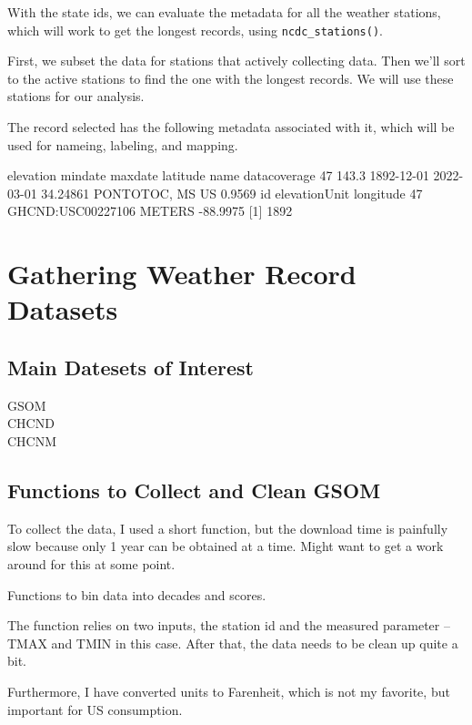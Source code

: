 \documentclass{article}
\begin{document}
With the state ids, we can evaluate the metadata for all the weather stations, which will work to get the longest records, using \texttt{ncdc\_stations()}. 

First, we subset the data for stations that actively collecting data. Then we'll sort to the active stations to find the one with the longest records. We will use these stations for our analysis.



The record selected has the following metadata associated with it, which will be used for nameing, labeling, and mapping. 

   elevation    mindate    maxdate latitude            name datacoverage
47     143.3 1892-12-01 2022-03-01 34.24861 PONTOTOC, MS US       0.9569
                  id elevationUnit longitude
47 GHCND:USC00227106        METERS  -88.9975
[1] 1892


\section{Gathering Weather Record Datasets}

\subsection{Main Datesets of Interest}

\begin{description}
  \item[GSOM]
  \item[CHCND]
  \item[CHCNM]
\end{description}

\subsection{Functions to Collect and Clean GSOM}

To collect the data, I used a short function, but the download time is painfully slow because only 1 year can be obtained at a time. Might want to get a work around for this at some point. 



Functions to bin data into decades and scores. 



The function relies on two inputs, the station id and the measured parameter -- TMAX and TMIN in this case. After that, the data needs to be clean up quite a bit. 

Furthermore, I have converted units to Farenheit, which is not my favorite, but important for US consumption.
\end{document}
